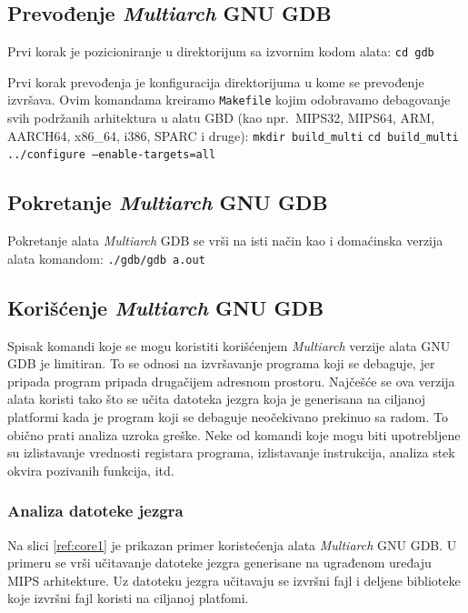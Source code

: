 \documentclass[12pt,oneside]{memoir}
\begin{document}
\subsection{Prevođenje \emph{Multiarch} GNU GDB}

Prvi korak je pozicioniranje u direktorijum sa izvornim kodom alata:
\newline
\texttt{cd gdb}

Prvi korak prevođenja je konfiguracija direktorijuma u kome se prevođenje izvršava. Ovim komandama kreiramo \texttt{Makefile} kojim odobravamo debagovanje svih podržanih arhitektura u alatu GBD (kao npr.~MIPS32, MIPS64, ARM, AARCH64, x86\_64, i386, SPARC i druge):
\newline
\texttt{mkdir build\_multi}
\newline
\texttt{cd build\_multi}
\newline
\texttt{../configure --enable-targets=all}

\subsection{Pokretanje \emph{Multiarch} GNU GDB}

Pokretanje alata \emph{Multiarch} GDB se vrši na isti način kao i domaćinska verzija alata komandom:
\newline
\texttt{./gdb/gdb a.out}

\subsection{Korišćenje \emph{Multiarch} GNU GDB}

Spisak komandi koje se mogu koristiti korišćenjem \emph{Multiarch} verzije alata GNU GDB je limitiran. To se odnosi na izvršavanje programa koji se debaguje, jer pripada program pripada drugačijem adresnom prostoru. Najčešće se ova verzija alata koristi tako što se učita datoteka jezgra koja je generisana na ciljanoj platformi kada je program koji se debaguje neočekivano prekinuo sa radom. To obično prati analiza uzroka greške. Neke od komandi koje mogu biti upotrebljene su izlistavanje vrednosti registara programa, izlistavanje instrukcija, analiza stek okvira pozivanih funkcija, itd.

\subsubsection{Analiza datoteke jezgra}

Na slici \ref{ref:core1} je prikazan primer koristećenja alata \emph{Multiarch} GNU GDB. U primeru se vrši učitavanje datoteke jezgra generisane na ugrađenom uređaju MIPS arhitekture. Uz datoteku jezgra učitavaju se izvršni fajl i deljene biblioteke koje izvršni fajl koristi na ciljanoj platfomi.
\end{document}

